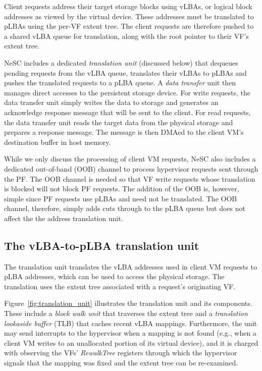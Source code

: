 Client requests address their target storage blocks using vLBAs, or logical block addresses as viewed by the virtual device. These addresses must be translated to pLBAs using the per-VF extent tree. The client requests are therefore pushed to a shared vLBA queue for translation, along with the root pointer to their VF's extent tree.

NeSC includes a dedicated \emph{translation unit} (discussed below) that dequeues pending requests from the vLBA queue, translates their vLBAs to pLBAs and pushes the translated requests to a pLBA queue. A \emph{data transfer} unit then manages direct accesses to the persistent storage device. For write requests, the data transfer unit simply writes the data to storage and generates an acknowledge response message that will be sent to the client. For read requests, the data transfer unit reads the target data from the physical storage and prepares a response message. The message is then DMAed to the client VM's destination buffer in host memory.

While we only discuss the processing of client VM requests, NeSC also includes a dedicated out-of-band (OOB) channel to process hypervisor requests sent through the PF. The OOB channel is needed so that VF write requests whose translation is blocked will not block PF requests. The addition of the OOB is, however, simple since PF requests use pLBAs and need not be translated. The OOB channel, therefore, simply adds cuts through to the pLBA queue but does not affect the the address translation unit.

\subsection{The vLBA-to-pLBA translation unit}

The translation unit translates the vLBA addresses used in client VM requests to pLBA addresses, which can be used to access the physical storage. The translation uses the extent tree associated with a request's originating VF.

Figure~\ref{fig:translation_unit} illustrates the translation unit and its components. These include a \emph{block walk unit} that traverses the extent tree and a \emph{translation lookaside buffer} (TLB) that caches recent vLBA mappings. Furthermore, the unit may send interrupts to the hypervisor when a mapping is not found (e.g., when a client VM writes to an unallocated portion of its virtual device), and it is charged with observing the VFs' \emph{RewalkTree} registers through which the hypervisor signals that the mapping was fixed and the extent tree can be re-examined.

